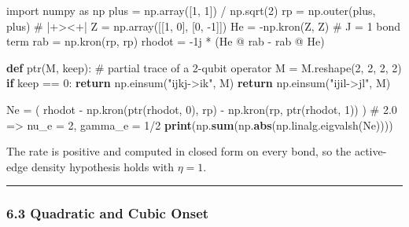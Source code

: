 \documentclass[
  11pt,
]{article}
\newenvironment{Shaded}{\begin{snugshade}}{\end{snugshade}}
\newcommand{\BuiltInTok}[1]{\textcolor[rgb]{0.39,0.29,0.61}{\textbf{#1}}}
\newcommand{\CommentTok}[1]{\textcolor[rgb]{0.54,0.53,0.53}{#1}}
\newcommand{\ControlFlowTok}[1]{\textcolor[rgb]{0.12,0.11,0.11}{\textbf{#1}}}
\newcommand{\DecValTok}[1]{\textcolor[rgb]{0.69,0.50,0.00}{#1}}
\newcommand{\ImportTok}[1]{\textcolor[rgb]{1.00,0.33,0.00}{#1}}
\newcommand{\KeywordTok}[1]{\textcolor[rgb]{0.12,0.11,0.11}{\textbf{#1}}}
\newcommand{\NormalTok}[1]{\textcolor[rgb]{0.12,0.11,0.11}{#1}}
\newcommand{\OperatorTok}[1]{\textcolor[rgb]{0.12,0.11,0.11}{#1}}
\newcommand{\OtherTok}[1]{\textcolor[rgb]{0.00,0.43,0.16}{#1}}
\newcommand{\StringTok}[1]{\textcolor[rgb]{0.75,0.01,0.01}{#1}}
\begin{document}
\begin{Shaded}
\begin{Highlighting}[]
\ImportTok{import}\NormalTok{ numpy }\ImportTok{as}\NormalTok{ np}
\NormalTok{plus }\OperatorTok{=}\NormalTok{ np.array([}\DecValTok{1}\NormalTok{, }\DecValTok{1}\NormalTok{]) }\OperatorTok{/}\NormalTok{ np.sqrt(}\DecValTok{2}\NormalTok{)}
\NormalTok{rp }\OperatorTok{=}\NormalTok{ np.outer(plus, plus)  }\CommentTok{\# |+\textgreater{}\textless{}+|}
\NormalTok{Z }\OperatorTok{=}\NormalTok{ np.array([[}\DecValTok{1}\NormalTok{, }\DecValTok{0}\NormalTok{], [}\DecValTok{0}\NormalTok{, }\OperatorTok{{-}}\DecValTok{1}\NormalTok{]])}
\NormalTok{He }\OperatorTok{=} \OperatorTok{{-}}\NormalTok{np.kron(Z, Z)  }\CommentTok{\# J = 1 bond term}
\NormalTok{rab }\OperatorTok{=}\NormalTok{ np.kron(rp, rp)}
\NormalTok{rhodot }\OperatorTok{=} \OperatorTok{{-}}\OtherTok{1j} \OperatorTok{*}\NormalTok{ (He }\OperatorTok{@}\NormalTok{ rab }\OperatorTok{{-}}\NormalTok{ rab }\OperatorTok{@}\NormalTok{ He)}

\KeywordTok{def}\NormalTok{ ptr(M, keep):}
    \CommentTok{\# partial trace of a 2{-}qubit operator}
\NormalTok{    M }\OperatorTok{=}\NormalTok{ M.reshape(}\DecValTok{2}\NormalTok{, }\DecValTok{2}\NormalTok{, }\DecValTok{2}\NormalTok{, }\DecValTok{2}\NormalTok{)}
    \ControlFlowTok{if}\NormalTok{ keep }\OperatorTok{==} \DecValTok{0}\NormalTok{:}
        \ControlFlowTok{return}\NormalTok{ np.einsum(}\StringTok{"ijkj{-}\textgreater{}ik"}\NormalTok{, M)}
    \ControlFlowTok{return}\NormalTok{ np.einsum(}\StringTok{"ijil{-}\textgreater{}jl"}\NormalTok{, M)}

\NormalTok{Ne }\OperatorTok{=}\NormalTok{ (}
\NormalTok{    rhodot}
    \OperatorTok{{-}}\NormalTok{ np.kron(ptr(rhodot, }\DecValTok{0}\NormalTok{), rp)}
    \OperatorTok{{-}}\NormalTok{ np.kron(rp, ptr(rhodot, }\DecValTok{1}\NormalTok{))}
\NormalTok{)}
\CommentTok{\# 2.0 =\textgreater{} nu\_e = 2, gamma\_e = 1/2}
\BuiltInTok{print}\NormalTok{(np.}\BuiltInTok{sum}\NormalTok{(np.}\BuiltInTok{abs}\NormalTok{(np.linalg.eigvalsh(Ne))))}
\end{Highlighting}
\end{Shaded}

The rate is positive and computed in closed form on every bond, so the active-edge density hypothesis holds with \(\eta=1\).

\begin{center}\rule{0.5\linewidth}{0.5pt}\end{center}

\subsubsection{6.3 Quadratic and Cubic Onset}\label{quadratic-and-cubic-onset}
\end{document}
